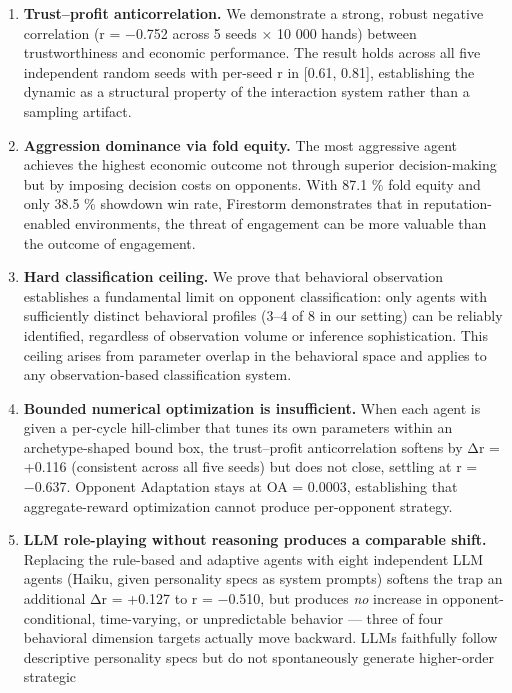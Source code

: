 \documentclass[
]{article}
\begin{document}
\begin{enumerate}
\def\labelenumi{\arabic{enumi}.}
\item
  \textbf{Trust--profit anticorrelation.} We demonstrate a strong,
  robust negative correlation (r = −0.752 across 5 seeds × 10 000 hands)
  between trustworthiness and economic performance. The result holds
  across all five independent random seeds with per-seed
  \textbar r\textbar{} in {[}0.61, 0.81{]}, establishing the dynamic as
  a structural property of the interaction system rather than a sampling
  artifact.
\item
  \textbf{Aggression dominance via fold equity.} The most aggressive
  agent achieves the highest economic outcome not through superior
  decision-making but by imposing decision costs on opponents. With 87.1
  \% fold equity and only 38.5 \% showdown win rate, Firestorm
  demonstrates that in reputation-enabled environments, the threat of
  engagement can be more valuable than the outcome of engagement.
\item
  \textbf{Hard classification ceiling.} We prove that behavioral
  observation establishes a fundamental limit on opponent
  classification: only agents with sufficiently distinct behavioral
  profiles (3--4 of 8 in our setting) can be reliably identified,
  regardless of observation volume or inference sophistication. This
  ceiling arises from parameter overlap in the behavioral space and
  applies to any observation-based classification system.
\item
  \textbf{Bounded numerical optimization is insufficient.} When each
  agent is given a per-cycle hill-climber that tunes its own parameters
  within an archetype-shaped bound box, the trust--profit
  anticorrelation softens by Δr = +0.116 (consistent across all five
  seeds) but does not close, settling at r = −0.637. Opponent Adaptation
  stays at OA = 0.0003, establishing that aggregate-reward optimization
  cannot produce per-opponent strategy.
\item
  \textbf{LLM role-playing without reasoning produces a comparable
  shift.} Replacing the rule-based and adaptive agents with eight
  independent LLM agents (Haiku, given personality specs as system
  prompts) softens the trap an additional Δr = +0.127 to r = −0.510, but
  produces \emph{no} increase in opponent-conditional, time-varying, or
  unpredictable behavior --- three of four behavioral dimension targets
  actually move backward. LLMs faithfully follow descriptive personality
  specs but do not spontaneously generate higher-order strategic

\end{enumerate}
\end{document}
